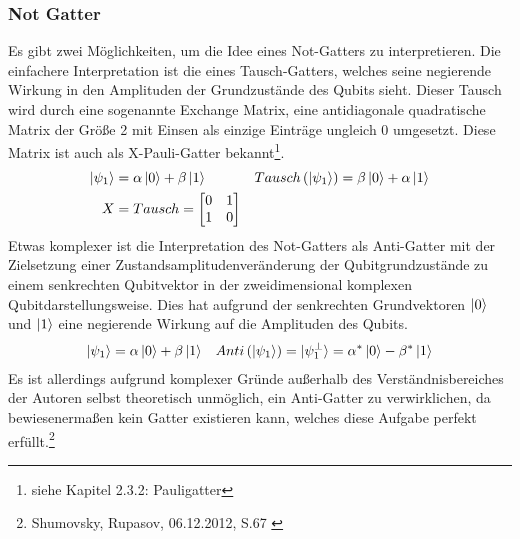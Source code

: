 \documentclass[12pt]{report}
\begin{document}
\subsubsection{Not Gatter}			%
Es gibt zwei Möglichkeiten, um die Idee eines Not-Gatters zu interpretieren.
Die einfachere Interpretation ist die eines Tausch-Gatters, welches seine negierende Wirkung in den Amplituden der Grundzustände des Qubits sieht. Dieser Tausch wird durch eine sogenannte \glqq Exchange Matrix\grqq , eine antidiagonale quadratische Matrix der Größe 2 mit Einsen als einzige Einträge ungleich 0 umgesetzt. Diese Matrix ist auch als X-Pauli-Gatter bekannt\footnote{siehe Kapitel 2.3.2: Pauligatter}.
\begin{align*}
	\ket{\psi_1} &= \alpha\ket{0} + \beta\ket{1} &
	Tausch\left(\ket{\psi_1}\right) &= \beta\ket{0} + \alpha\ket{1}\\
	X &= Tausch = \begin{bmatrix} 0&1\\1&0 \end{bmatrix} 
\end{align*}
Etwas komplexer ist die Interpretation des Not-Gatters als Anti-Gatter mit der Zielsetzung einer Zustandsamplitudenveränderung der Qubitgrundzustände zu einem senkrechten Qubitvektor in der zweidimensional komplexen Qubitdarstellungsweise. Dies hat aufgrund der senkrechten Grundvektoren $\ket{0}$ und $\ket{1}$ eine negierende Wirkung auf die Amplituden des Qubits.
\begin{align*}
	\ket{\psi_1} &= \alpha\ket{0} + \beta\ket{1} &
	Anti\left(\ket{\psi_1}\right) = \ket{\psi_1^{\perp}} &= \alpha^*\ket{0} - \beta^*\ket{1}\\
\end{align*}
Es ist allerdings aufgrund komplexer Gründe außerhalb des Verständnisbereiches der Autoren selbst theoretisch unmöglich, ein Anti-Gatter zu verwirklichen, da bewiesenermaßen kein Gatter existieren kann, welches diese Aufgabe perfekt erfüllt.\footnote{Shumovsky, Rupasov, 06.12.2012, S.67 \cite{p234-2}}

\newpage
\end{document}
